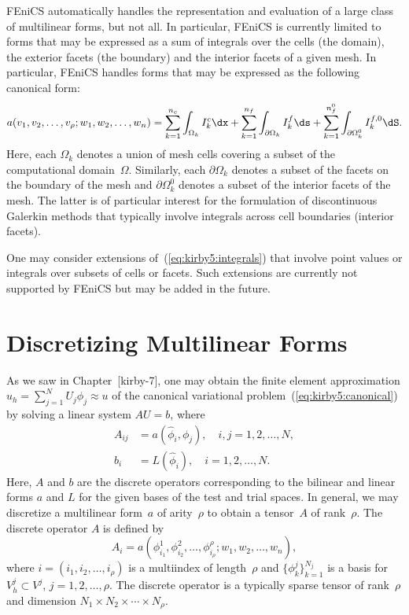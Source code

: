 FEniCS automatically handles the representation and evaluation of a
large class of multilinear forms, but not all. In particular, FEniCS
is currently limited to forms that may be expressed as a sum of
integrals over the cells (the domain), the exterior facets (the
boundary) and the interior facets of a given mesh. In particular,
FEniCS handles forms that may be expressed as the following canonical
form:
\begin{equation} \label{eq:kirby5:integrals}
  a(v_1, v_2, \ldots, v_{\rho}; w_1, w_2, \ldots, w_n)
  =
  \sum_{k=1}^{n_c}   \int_{\Omega_k} I^c_k \dx +
  \sum_{k=1}^{n_f}   \int_{\partial\Omega_k} I^f_k \ds +
  \sum_{k=1}^{n_f^0} \int_{\partial\Omega_k^0} I^{f,0}_k \dS.
\end{equation}
Here, each $\Omega_k$ denotes a union of mesh cells covering a subset
of the computational domain~$\Omega$. Similarly, each $\partial
\Omega_k$ denotes a subset of the facets on the boundary of the mesh
and $\partial \Omega_k^0$ denotes a subset of the interior facets of
the mesh. The latter is of particular interest for the formulation of
discontinuous Galerkin methods that typically involve integrals across
cell boundaries (interior facets).

One may consider extensions of~(\ref{eq:kirby5:integrals}) that
involve point values or integrals over subsets of cells or
facets. Such extensions are currently not supported by FEniCS but may
be added in the future.

\section{Discretizing Multilinear Forms}

As we saw in Chapter~[kirby-7], one may obtain the finite element
approximation $u_h = \sum_{j=1}^N U_j \phi_j \approx u$ of the
canonical variational problem~(\ref{eq:kirby5:canonical}) by solving a
linear system $AU=b$, where
\begin{displaymath}
  \begin{split}
    A_{ij} &= a(\hat{\phi}_i, \phi_j), \quad i,j = 1,2,\ldots,N, \\
    b_i &= L(\hat{\phi}_i), \quad i = 1,2,\ldots,N.
  \end{split}
\end{displaymath}
Here, $A$ and $b$ are the discrete operators corresponding to the
bilinear and linear forms $a$ and $L$ for the given bases of the test
and trial spaces. In general, we may discretize a multilinear form~$a$
of arity~$\rho$ to obtain a tensor~$A$ of rank~$\rho$. The discrete
operator $A$ is defined by
\begin{displaymath}
  A_i = a(\phi^1_{i_1}, \phi^2_{i_2}, \ldots, \phi^{\rho}_{i_{\rho}};
          w_1, w_2, \ldots, w_n),
\end{displaymath}
where $i = (i_1, i_2, \ldots, i_{\rho})$ is a multiindex of
length~$\rho$ and $\{\phi^j_k\}_{k=1}^{N_j}$ is a basis for $V_h^j
\subset V^j$, $j = 1,2,\ldots,\rho$. The discrete operator is a
typically sparse tensor of rank~$\rho$ and dimension $N_1 \times N_2
\times \cdots \times N_{\rho}$.

